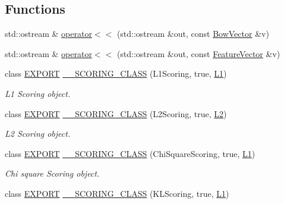 \subsection*{Functions}
\begin{DoxyCompactItemize}
\item 
std\+::ostream \& \mbox{\hyperlink{namespace_d_bo_w2_a06d2058b1bde1cdc49f277fec62073e2}{operator$<$$<$}} (std\+::ostream \&out, const \mbox{\hyperlink{class_d_bo_w2_1_1_bow_vector}{Bow\+Vector}} \&v)
\item 
std\+::ostream \& \mbox{\hyperlink{namespace_d_bo_w2_ac65e2bfb945a77c5294d0300a4fed49c}{operator$<$$<$}} (std\+::ostream \&out, const \mbox{\hyperlink{class_d_bo_w2_1_1_feature_vector}{Feature\+Vector}} \&v)
\item 
class \mbox{\hyperlink{config_8h_a3472d8cdbb788d5f1815b3522595bc49}{E\+X\+P\+O\+RT}} \mbox{\hyperlink{namespace_d_bo_w2_a366d1d4a75ab8276e171af0aaa04b29b}{\+\_\+\+\_\+\+S\+C\+O\+R\+I\+N\+G\+\_\+\+C\+L\+A\+SS}} (L1\+Scoring, true, \mbox{\hyperlink{namespace_d_bo_w2_a53e9e0bcfc25c861815e413a7cf3fa51a94f5879ff083c0a8364805ae4f9c2d5c}{L1}})
\begin{DoxyCompactList}\small\item\em L1 Scoring object. \end{DoxyCompactList}\item 
class \mbox{\hyperlink{config_8h_a3472d8cdbb788d5f1815b3522595bc49}{E\+X\+P\+O\+RT}} \mbox{\hyperlink{namespace_d_bo_w2_a38216a543c4968d22bf2ffd2178e299c}{\+\_\+\+\_\+\+S\+C\+O\+R\+I\+N\+G\+\_\+\+C\+L\+A\+SS}} (L2\+Scoring, true, \mbox{\hyperlink{namespace_d_bo_w2_a53e9e0bcfc25c861815e413a7cf3fa51aff96c9503798aa8504a954d3832e5eaa}{L2}})
\begin{DoxyCompactList}\small\item\em L2 Scoring object. \end{DoxyCompactList}\item 
class \mbox{\hyperlink{config_8h_a3472d8cdbb788d5f1815b3522595bc49}{E\+X\+P\+O\+RT}} \mbox{\hyperlink{namespace_d_bo_w2_adc330022cadf004b7ed5b84203287039}{\+\_\+\+\_\+\+S\+C\+O\+R\+I\+N\+G\+\_\+\+C\+L\+A\+SS}} (Chi\+Square\+Scoring, true, \mbox{\hyperlink{namespace_d_bo_w2_a53e9e0bcfc25c861815e413a7cf3fa51a94f5879ff083c0a8364805ae4f9c2d5c}{L1}})
\begin{DoxyCompactList}\small\item\em Chi square Scoring object. \end{DoxyCompactList}\item 
class \mbox{\hyperlink{config_8h_a3472d8cdbb788d5f1815b3522595bc49}{E\+X\+P\+O\+RT}} \mbox{\hyperlink{namespace_d_bo_w2_a9af1c21239089d77c337c65fac3e7bf5}{\+\_\+\+\_\+\+S\+C\+O\+R\+I\+N\+G\+\_\+\+C\+L\+A\+SS}} (K\+L\+Scoring, true, \mbox{\hyperlink{namespace_d_bo_w2_a53e9e0bcfc25c861815e413a7cf3fa51a94f5879ff083c0a8364805ae4f9c2d5c}{L1}})

\end{DoxyCompactItemize}

